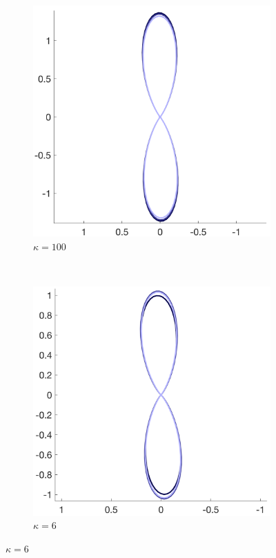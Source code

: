 \begin{figure}
  \centering
  \begin{subfigure}[]{0.4\textwidth}
    \includegraphics[width=\textwidth]{figures/frf_experiment/fibres_fod_kappa100_b_3000.png}
    \caption{$\kappa = 100$}
  \end{subfigure}
  ~
  \begin{subfigure}[]{0.4\textwidth}
    \includegraphics[width=\textwidth]{figures/frf_experiment/fibres_fod_kappa6_b_3000.png}
    \caption{$\kappa = 6$}
  \end{subfigure}


\end{figure}
